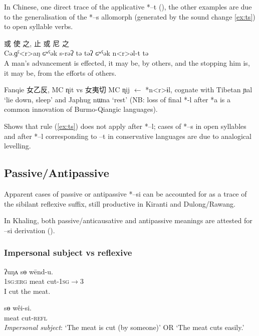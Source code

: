 \documentclass[oldfontcommands,oneside,a4paper,11pt]{article}
\newcommand{\ipa}[1]{{\phon \mbox{#1}}} %
\newcommand{\zh}[1]{{\cn #1}}
\begin{document}
In Chinese, one direct trace of the applicative *\ipa{--t} (\citealt{sagart04directions}), the other examples are due to the generalisation of the *\ipa{--s} allomorph (generated by the sound change \ref{ex:ts}) to open syllable verbs.
\begin{exe}
\ex 
\gll \zh{行} \zh{或} \zh{使} \zh{之}, \zh{止} \zh{或} \zh{尼} \zh{之} \\
 \ipa{Cə.ɡˁ<r>aŋ}  \ipa{ɢʷˁək}  \ipa{s-rəʔ}  \ipa{tə}  \ipa{təʔ}  \ipa{ɢʷˁək}  \ipa{n<r>əl-t}  \ipa{tə} \\
\glt A man's advancement is effected, it may be, by others, and the stopping him is, it may be, from the efforts of others.
\end{exe}


Fanqie \zh{女乙反}, MC \ipa{ɳit} vs \zh{女夷切} MC \ipa{ɳij} $\leftarrow$ *\ipa{n<r>ɨl}, cognate with Tibetan \ipa{ɲal} `lie down, sleep' and Japhug \ipa{nɯna} `rest' (NB: loss of final *\ipa{-l} after *\ipa{a} is a common innovation of Burmo-Qiangic languages). 

Shows that rule (\ref{ex:ts}) does not apply after *\ipa{--l}; cases of *\ipa{--s} in open syllables and after *\ipa{--l} corresponding to \ipa{--t} in conservative languages are due to analogical levelling.
\subsection{Passive/Antipassive}
Apparent cases of passive or antipassive *\ipa{--si} can be accounted for as a trace of the sibilant reflexive suffix, still productive in Kiranti and Dulong/Rawang.

In Khaling, both passive/anticausative and antipassive meanings are attested for \ipa{--si} derivation (\citealt{jacques16si}).
\subsubsection{Impersonal subject vs reflexive} 

\begin{exe}
\ex \label{ex:wendu} 
\gll 
\ipa{ʔuŋʌ}  	\ipa{sɵ}  	\ipa{wēnd-u.}  \\
\textsc{1sg:erg} meat cut-\textsc{1sg$\rightarrow$3} \\
\glt I cut the meat.
\end{exe}

\begin{exe}
\ex \label{ex:weisi} 
\gll 
 \ipa{sɵ}  	\ipa{wêi-si.}  \\
 meat cut-\textsc{refl} \\
\glt \textit{Impersonal subject}: `The meat is cut (by someone)' OR `The meat cuts easily.'
\end{exe}
\end{document}
